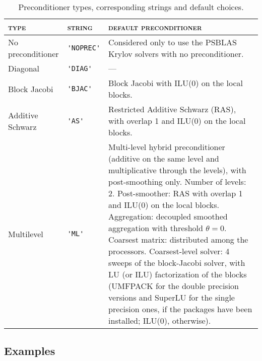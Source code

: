 \begin{table}[th]
\begin{center}
\begin{tabular}{|l|l|p{7.8cm}|}
\hline
\textsc{type}       & \textsc{string} & \textsc{default preconditioner} \\ \hline
No preconditioner &\verb|'NOPREC'|& Considered only to use the PSBLAS
                                    Krylov solvers with no preconditioner. \\ \hline
Diagonal          & \verb|'DIAG'| & --- \\ \hline
Block Jacobi      & \verb|'BJAC'| & Block Jacobi with ILU(0) on the local blocks.\\ \hline
Additive Schwarz  & \verb|'AS'|   & Restricted Additive Schwarz (RAS),
                                    with overlap 1 and ILU(0) on the local blocks. \\ \hline
Multilevel        &\verb|'ML'|    & Multi-level hybrid preconditioner (additive on the
                                    same level and multiplicative through the levels),
                                    with post-smoothing only.
                                    Number of levels: 2.
	                                  Post-smoother: RAS with overlap 1 and ILU(0)
                                    on the local blocks.
                                    Aggregation: decoupled smoothed aggregation with
                                    threshold $\theta = 0$.
                                    Coarsest matrix: distributed among the processors.
                                    Coarsest-level solver: 
                                    4 sweeps of the block-Jacobi solver, 
                                    with LU (or ILU) factorization of the blocks
                                    (UMFPACK for the double precision versions and
                                    SuperLU for the single precision ones, if the packages
                                    have been installed; ILU(0), otherwise).         \\
\hline
\end{tabular}
\end{center}

\caption{Preconditioner types, corresponding strings and default choices.
\label{tab:precinit}}
\end{table}

\subsection{Examples\label{sec:examples}}

